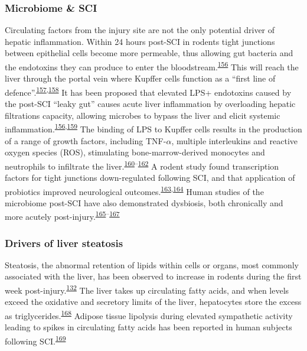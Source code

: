 \documentclass[
]{article}
\begin{document}
\hypertarget{microbiome-sci}{%
\subsubsection{Microbiome \& SCI}\label{microbiome-sci}}

Circulating factors from the injury site are not the only potential driver of hepatic inflammation.
Within 24 hours post-SCI in rodents tight junctions between epithelial cells become more permeable, thus allowing gut bacteria and the endotoxins they can produce to enter the bloodstream.\textsuperscript{\protect\hyperlink{ref-liu_study_2004}{156}}
This will reach the liver through the portal vein where Kupffer cells function as a ``first line of defence''.\textsuperscript{\protect\hyperlink{ref-jenne_immune_2013}{157},\protect\hyperlink{ref-balmer_liver_2014}{158}}
It has been proposed that elevated LPS+ endotoxins caused by the post-SCI ``leaky gut'' causes acute liver inflammation by overloading hepatic filtrations capacity, allowing microbes to bypass the liver and elicit systemic inflammation.\textsuperscript{\protect\hyperlink{ref-liu_study_2004}{156},\protect\hyperlink{ref-oconnor_investigation_2018}{159}}
The binding of LPS to Kupffer cells results in the production of a range of growth factors, including TNF-\(\alpha\), multiple interleukins and reactive oxygen species (ROS), stimulating bone-marrow-derived monocytes and neutrophils to infiltrate the liver.\textsuperscript{\protect\hyperlink{ref-myers_following_2019}{160}--\protect\hyperlink{ref-kazankov_role_2019}{162}}
A rodent study found transcription factors for tight junctions down-regulated following SCI, and that application of probiotics improved neurological outcomes.\textsuperscript{\protect\hyperlink{ref-kigerl_gut_2018}{163},\protect\hyperlink{ref-kigerl_gut_2016}{164}}
Human studies of the microbiome post-SCI have also demonstrated dysbiosis, both chronically and more acutely post-injury.\textsuperscript{\protect\hyperlink{ref-zhang_gut_2018}{165}--\protect\hyperlink{ref-bazzocchi_changes_2021}{167}}

\hypertarget{drivers-of-liver-steatosis}{%
\subsubsection{Drivers of liver steatosis}\label{drivers-of-liver-steatosis}}

Steatosis, the abnormal retention of lipids within cells or organs, most commonly associated with the liver, has been observed to increase in rodents during the first week post-injury.\textsuperscript{\protect\hyperlink{ref-sauerbeck_spinal_2014}{132}}
The liver takes up circulating fatty acids, and when levels exceed the oxidative and secretory limits of the liver, hepatocytes store the excess as triglycerides.\textsuperscript{\protect\hyperlink{ref-diraison_role_1998}{168}}
Adipose tissue lipolysis during elevated sympathetic activity leading to spikes in circulating fatty acids has been reported in human subjects following SCI.\textsuperscript{\protect\hyperlink{ref-karlsson_insulin_1999}{169}}
\end{document}
